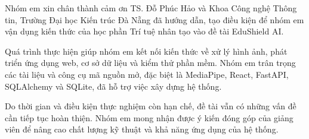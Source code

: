 \begin{acknowledgments}
Nhóm em xin chân thành cảm ơn TS. Đỗ Phúc Hảo và Khoa Công nghệ Thông tin, Trường Đại học Kiến trúc Đà Nẵng đã hướng dẫn, tạo điều kiện để nhóm em vận dụng kiến thức của học phần Trí tuệ nhân tạo vào đề tài EduShield AI.

Quá trình thực hiện giúp nhóm em kết nối kiến thức về xử lý hình ảnh, phát triển ứng dụng web, cơ sở dữ liệu và kiểm thử phần mềm. Nhóm em trân trọng các tài liệu và công cụ mã nguồn mở, đặc biệt là MediaPipe, React, FastAPI, SQLAlchemy và SQLite, đã hỗ trợ việc xây dựng hệ thống.

Do thời gian và điều kiện thực nghiệm còn hạn chế, đề tài vẫn có những vấn đề cần tiếp tục hoàn thiện. Nhóm em mong nhận được ý kiến đóng góp của giảng viên để nâng cao chất lượng kỹ thuật và khả năng ứng dụng của hệ thống.
\end{acknowledgments}
